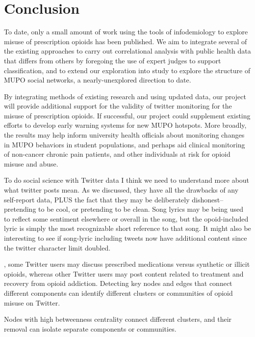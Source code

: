 \documentclass[sigconf]{acmart}
\begin{document}
\section{Conclusion}

To date, only a small amount of work using the tools of infodemiology to 
explore misuse of prescription opioids has been published. We aim to integrate 
several of the existing approaches to carry out correlational analysis with 
public health data that differs from others by foregoing the use of expert 
judges to support classification, and to extend our exploration into study to 
explore the structure of MUPO social networks, a nearly-unexplored direction 
to date. 

By integrating methods of existing research and using updated data, our project
will provide additional support for the validity of twitter monitoring for the
misuse of prescription opioids. If successful, our project could supplement 
existing efforts to develop early warning systems for new MUPO hotspots. More 
broadly, the results may help inform university health officials about
monitoring changes in MUPO behaviors in student populations, and perhaps aid 
clinical monitoring of non-cancer chronic pain patients, and other individuals 
at risk for opioid misuse and abuse. 
 
To do social science with Twitter data I think we need to understand more about 
what twitter posts mean. As we discussed, they have all the drawbacks of any 
self-report data, PLUS the fact that they may be deliberately dishonest–
pretending to be cool, or pretending to be clean. Song lyrics may be being used 
to reflect some sentiment elsewhere or overall in the song, but the opoid-included 
lyric is simply the most recognizable short reference to that song. It might also 
be interesting to see if song-lyric including tweets now have additional 
content since the twitter character limit doubled.
 
, some Twitter users may discuss 
prescribed medications versus synthetic or illicit opioids, whereas other 
Twitter users may post content related to treatment and recovery from opioid 
addiction. Detecting key nodes and edges that connect different components 
can identify different clusters or communities of opioid misuse on Twitter.



Nodes with high 
betweenness centrality connect different clusters, and their removal can
isolate separate components or communities. 
\end{document}
